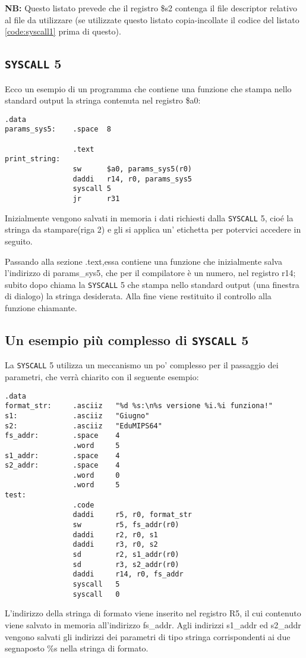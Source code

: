 \documentclass[12pt]{report}
\newcommand{\SC}{\texttt{SYSCALL}}
\newcommand{\OF}{\textbf{NB:} Questo listato prevede che il registro \$s2 contenga il file descriptor
relativo al file da utilizzare (se utilizzate questo listato copia-incollate il codice del listato \ref{code:syscall1} prima di questo).}
\begin{document}
\OF{}
\subsection{\SC{} 5}
Ecco un esempio di un programma che contiene una funzione che stampa nello
standard output la stringa contenuta nel registro \$a0:
\begin{lstlisting}[caption={Esempio \SC{} 5}, label={code:syscall5}, style={mips}]
                .data
params_sys5:    .space  8

                .text
print_string:   
                sw      $a0, params_sys5(r0)    
                daddi   r14, r0, params_sys5
                syscall 5
                jr      r31
\end{lstlisting}
Inizialmente vengono salvati in memoria i dati richiesti dalla \SC{} 5, cio\'e
la stringa da stampare(riga 2) e gli si applica un' etichetta per potervici
accedere in seguito.

Passando alla sezione .text,essa contiene una funzione che inizialmente salva
l'indirizzo di params\_sys5, che per il compilatore \`{e} un numero, nel
registro r14; subito dopo chiama la \SC{} 5 che stampa nello
standard output (una finestra di dialogo) la stringa desiderata. Alla fine viene
restituito il controllo alla funzione chiamante.

\subsection{Un esempio pi\`u complesso di \SC{} 5}
La \SC{} 5 utilizza un meccanismo un po' complesso per il passaggio dei
parametri, che verr\`a chiarito con il seguente esempio:

\begin{lstlisting}[caption={Esempio non banale di \SC{} 5}, label={code:printf}, style={mips}]
                .data
format_str:     .asciiz   "%d %s:\n%s versione %i.%i funziona!"
s1:             .asciiz   "Giugno"
s2:             .asciiz   "EduMIPS64"
fs_addr:        .space    4
                .word     5    
s1_addr:        .space    4
s2_addr:        .space    4
                .word     0
                .word     5
test:
                .code
                daddi     r5, r0, format_str
                sw        r5, fs_addr(r0)
                daddi     r2, r0, s1
                daddi     r3, r0, s2
                sd        r2, s1_addr(r0)
                sd        r3, s2_addr(r0)
                daddi     r14, r0, fs_addr
                syscall   5
                syscall   0
\end{lstlisting}
L'indirizzo della stringa di formato viene inserito nel registro R5, il cui
contenuto viene salvato in memoria all'indirizzo fs\_addr. Agli indirizzi
s1\_addr ed s2\_addr vengono salvati gli indirizzi dei parametri di tipo stringa
corrispondenti ai due segnaposto \%s nella stringa di formato.
\end{document}
